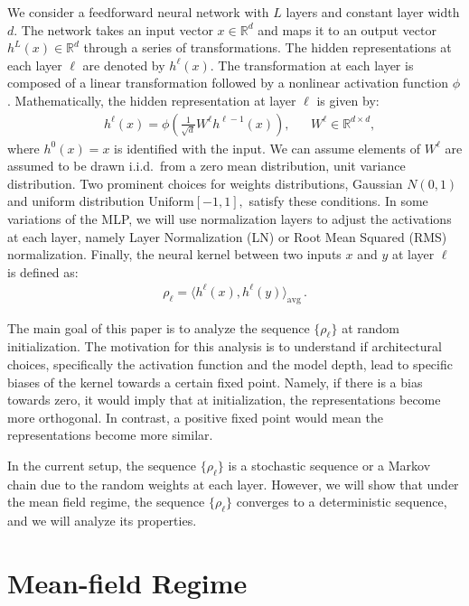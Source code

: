 \documentclass[twoside]{article}
\newcommand{\avg}{\text{avg}}
\theoremstyle{definition}
\begin{document}
We consider a feedforward neural network with $L$ layers and constant layer width $d$. The network takes an input vector $x \in \mathbb{R}^d$ and maps it to an output vector $h^L(x) \in \mathbb{R}^d$ through a series of transformations. The hidden representations at each layer $\ell$ are denoted by $h^\ell(x)$. The transformation at each layer is composed of a linear transformation followed by a nonlinear activation function $\phi$. Mathematically, the hidden representation at layer $\ell$ is given by:
\begin{align}
& h^\ell(x) = \phi\left(\frac{1}{\sqrt{d}}W^\ell h^{\ell-1}(x)\right), && W^\ell \in \mathbb{R}^{d \times d},
\end{align}
where $h^0(x)=x$ is identified with the input. We can assume elements of $W^\ell$ are assumed to be drawn i.i.d.~from a zero mean distribution, unit variance distribution. Two prominent choices for weights distributions, Gaussian $N(0,1)$ and uniform distribution $\text{Uniform}[-1,1],$ satisfy these conditions. In some variations of the MLP, we will use normalization layers to adjust the activations at each layer, namely Layer Normalization (LN) or Root Mean Squared (RMS) normalization. Finally, the neural kernel between two inputs $x$ and $y$ at layer $\ell$ is defined as:
\begin{align}
    \rho_\ell = \langle h^\ell(x), h^\ell(y) \rangle_\avg \,.
\end{align}

The main goal of this paper is to analyze the sequence $\{\rho_\ell\}$ at random initialization. The motivation for this analysis is to understand if architectural choices, specifically the activation function and the model depth, lead to specific biases of the kernel towards a certain fixed point. Namely, if there is a bias towards zero, it would imply that at initialization, the representations become more orthogonal. In contrast, a positive fixed point would mean the representations become more similar.

In the current setup, the sequence $\{\rho_\ell\}$ is a stochastic sequence or a Markov chain due to the random weights at each layer. However, we will show that under the mean field regime, the sequence $\{\rho_\ell\}$ converges to a deterministic sequence, and we will analyze its properties.


\section{Mean-field Regime}
\end{document}
